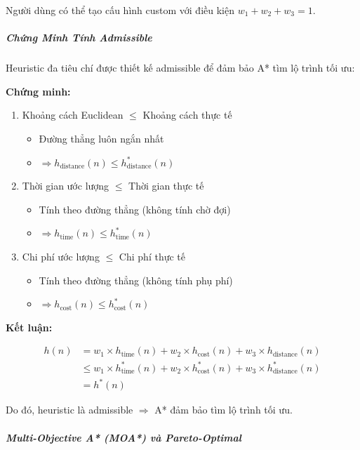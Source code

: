 Người dùng có thể tạo cấu hình custom với điều kiện $w_1 + w_2 + w_3 = 1$.

\subparagraph{Chứng Minh Tính Admissible}

Heuristic đa tiêu chí được thiết kế admissible để đảm bảo A* tìm lộ trình tối ưu:

\textbf{Chứng minh:}

\begin{enumerate}
    \item Khoảng cách Euclidean $\leq$ Khoảng cách thực tế
    \begin{itemize}
        \item Đường thẳng luôn ngắn nhất
        \item $\Rightarrow h_{\text{distance}}(n) \leq h^*_{\text{distance}}(n)$
    \end{itemize}
    
    \item Thời gian ước lượng $\leq$ Thời gian thực tế
    \begin{itemize}
        \item Tính theo đường thẳng (không tính chờ đợi)
        \item $\Rightarrow h_{\text{time}}(n) \leq h^*_{\text{time}}(n)$
    \end{itemize}
    
    \item Chi phí ước lượng $\leq$ Chi phí thực tế
    \begin{itemize}
        \item Tính theo đường thẳng (không tính phụ phí)
        \item $\Rightarrow h_{\text{cost}}(n) \leq h^*_{\text{cost}}(n)$
    \end{itemize}
\end{enumerate}

\textbf{Kết luận:}

\begin{align*}
h(n) &= w_1 \times h_{\text{time}}(n) + w_2 \times h_{\text{cost}}(n) + w_3 \times h_{\text{distance}}(n) \\
     &\leq w_1 \times h^*_{\text{time}}(n) + w_2 \times h^*_{\text{cost}}(n) + w_3 \times h^*_{\text{distance}}(n) \\
     &= h^*(n)
\end{align*}

Do đó, heuristic là admissible $\Rightarrow$ A* đảm bảo tìm lộ trình tối ưu.

\subparagraph{Multi-Objective A* (MOA*) và Pareto-Optimal}

